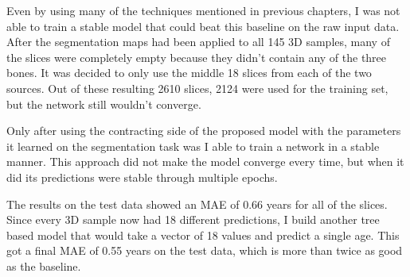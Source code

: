 Even by using many of the techniques mentioned in previous chapters, I was not able to train a stable model that could beat this baseline on the raw input data. After the segmentation maps had been applied to all 145 3D samples, many of the slices were completely empty because they didn't contain any of the three bones. It was decided to only use the middle 18 slices from each of the two sources. Out of these resulting 2610 slices, 2124 were used for the training set, but the network still wouldn't converge.

Only after using the contracting side of the proposed model with the parameters it learned on the segmentation task was I able to train a network in a stable manner. This approach did not make the model converge every time, but when it did its predictions were stable through multiple epochs.

The results on the test data showed an MAE of 0.66 years for all of the slices. Since every 3D sample now had 18 different predictions, I build another tree based model that would take a vector of 18 values and predict a single age. This got a final MAE of 0.55 years on the test data, which is more than twice as good as the baseline.

\newpage